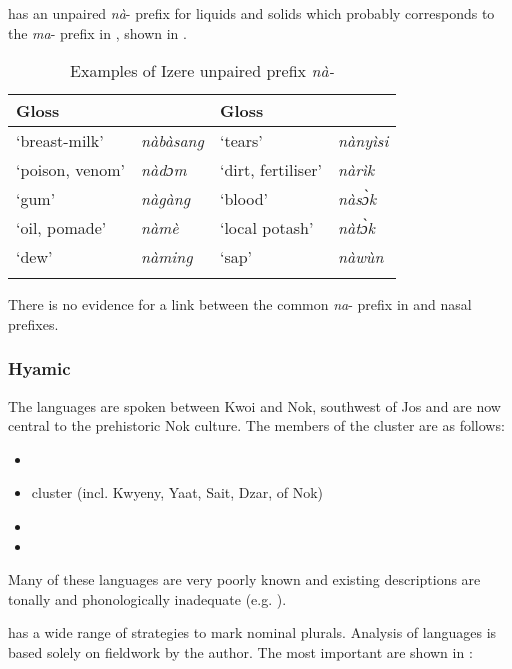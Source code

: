 \documentclass[output=paper]{langsci/langscibook}
\begin{document}
 has an unpaired \textit{nà}- prefix for liquids and solids which probably corresponds to the \textit{ma}- prefix in , shown in .

\begin{table}
\caption{Examples of Izere unpaired prefix \textit{nà-}}
\label{extab:nomaffplat:14}
\begin{tabularx}{\textwidth}{XX@{\qquad}Xl}
\lsptoprule
Gloss 	&  {\ilit{Izere}} 	& Gloss 	&  {\ilit{Izere}}\\
\midrule
‘breast-milk’ 	& \itshape nàbàsang 	& ‘tears’ 	& \itshape nànyìsi\\
‘poison, venom’ 	& \textit{nàdɔm} 	& ‘dirt, fertiliser’ 	& \itshape nàrìk\\
‘gum’ 	& \itshape nàgàng 	& ‘blood’ 	& \itshape nàsɔ̀k\\
‘oil, pomade’ 	& \itshape nàmè 	& ‘local potash’ 	& \itshape nàtɔ̀k\\
‘dew’ 	& \itshape nàming 	& ‘sap’ 	& \itshape nàwùn\\
\lspbottomrule
\end{tabularx}
\end{table}

There is no evidence for a link between the common \textit{na}- prefix in  and  nasal prefixes.
 
\subsubsection{Hyamic} %

The  languages are spoken between Kwoi and Nok, southwest of Jos and are now central to the prehistoric Nok culture. The members of the  cluster are as follows:

\begin{itemize}
\item {}
\item {} cluster (incl. Kwyeny, Yaat, Sait, Dzar,  of Nok)
\item {}
\item {}
\end{itemize}

Many of these languages are very poorly known and existing descriptions are tonally and phonologically inadequate (e.g. \citealt{Dihoff1976,Jockers1982}).

 has a wide range of strategies to mark nominal plurals. Analysis of  languages is based solely on fieldwork by the author. The most important are shown in :
\end{document}
